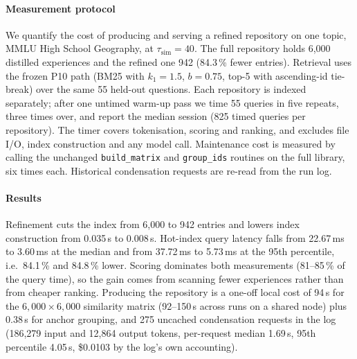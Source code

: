 
\paragraph{Measurement protocol}
We quantify the cost of producing and serving a refined repository on one topic, MMLU High School
Geography, at $\tau_{\mathrm{sim}}=40$. The full repository holds 6{,}000 distilled experiences and the
refined one 942 (84.3\,\% fewer entries). Retrieval uses the frozen P10 path (BM25 with $k_1=1.5$,
$b=0.75$, top-5 with ascending-id tie-break) over the same 55 held-out questions. Each repository is
indexed separately; after one untimed warm-up pass we time 55 queries in five repeats, three times over,
and report the median session (825 timed queries per repository). The timer covers tokenisation,
scoring and ranking, and excludes file I/O, index construction and any model call. Maintenance cost is
measured by calling the unchanged \texttt{build\_matrix} and \texttt{group\_ids} routines on the full
library, six times each. Historical condensation requests are re-read from the run log.

\paragraph{Results}
Refinement cuts the index from 6{,}000 to 942 entries and lowers index construction from 0.035\,s to
0.008\,s. Hot-index query latency falls from 22.67\,ms to 3.60\,ms at the median and from 37.72\,ms to
5.73\,ms at the 95th percentile, i.e.\ 84.1\,\% and 84.8\,\% lower. Scoring dominates both
measurements (81--85\,\% of the query time), so the gain comes from scanning fewer experiences rather
than from cheaper ranking. Producing the repository is a one-off local cost of 94\,s for the
$6{,}000\times6{,}000$ similarity matrix (92--150\,s across runs on a shared node) plus 0.38\,s for
anchor grouping, and 275 uncached condensation requests in the log (186{,}279 input and 12{,}864 output
tokens, per-request median 1.69\,s, 95th percentile 4.05\,s, \$0.0103 by the log's own accounting).
